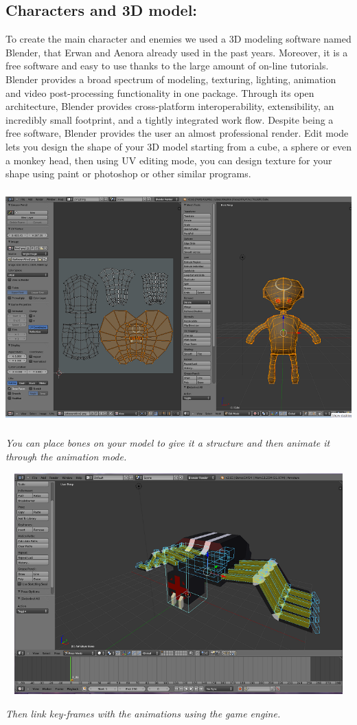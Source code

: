 \documentclass[article]{report} %
\begin{document}
 \subsection{Characters and 3D model:}
	To create the main character and enemies we used a 3D modeling software named Blender, that Erwan and Aenora already used in the past years.
Moreover, it is a free software and easy to use thanks to the large amount of on-line tutorials. Blender provides a broad spectrum of modeling, texturing, lighting, animation and video post-processing functionality in one package. Through its open architecture, Blender provides cross-platform interoperability, extensibility, an incredibly small footprint, and a tightly integrated work flow.
Despite being a free software, Blender provides the user an almost professional render. 
Edit mode lets you design the shape of your 3D model starting from a cube, a sphere or even a monkey head, then using UV editing mode, you can design texture for your shape using paint or photoshop or other similar programs.
\begin{center}
				\includegraphics[width=14.5cm, height=9cm]{images/Graphics/UV_edit.png}
				\begin{center}\it You can place bones on your model to give it a structure and then animate it through the animation mode. 							\end{center}	
				\includegraphics[width=15cm, height=8.5cm]{images/Graphics/spider_blend.png}
				\begin{center}\it Then link key-frames with the animations using the game engine. \end{center}
\end{center}
\end{document}
